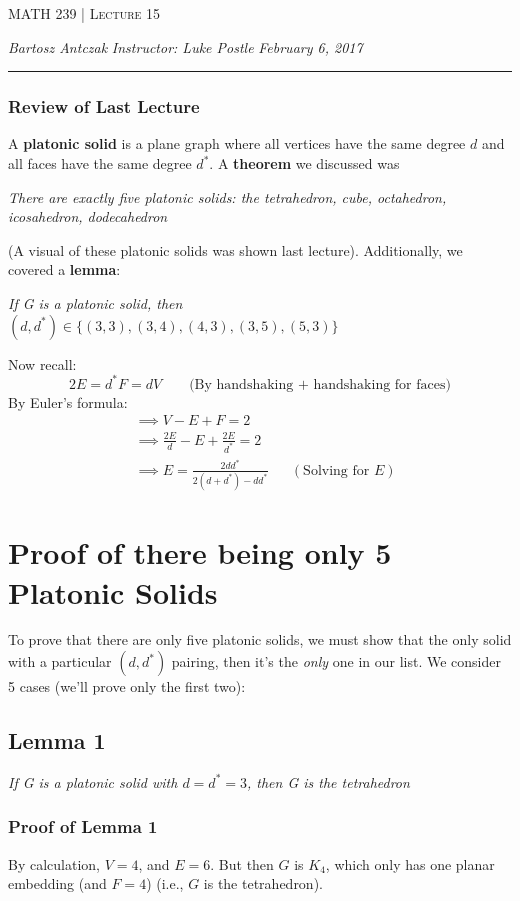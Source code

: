 \documentclass{report}
\newcommand{\lectureNum}{15}
\newcommand{\curDate}{February 6, 2017}
\newcommand{\course}{MATH 239}
\newcommand{\instructor}{Luke Postle}
\begin{document}
\begin{center}
\begin{Large}
\textsc{\course{} | Lecture \lectureNum{}}
\end{Large}
\end{center} 
\noindent \textit{Bartosz Antczak} \hfill
\textit{Instructor: \instructor{}} \hfill
\textit{\curDate{}}
\rule{\textwidth}{0.4pt}

\subsubsection{Review of Last Lecture}
A \textbf{platonic solid} is a plane graph where all vertices have the same degree $d$ and all faces have the same degree $d^*$. A \textbf{theorem} we discussed was
\begin{center}
\textit{There are exactly five platonic solids: the tetrahedron, cube, octahedron, icosahedron, dodecahedron}
\end{center}
(A visual of these platonic solids was shown last lecture). Additionally, we covered a \textbf{lemma}:
\begin{center}
\textit{If G is a platonic solid, then $(d, d^*) \in \{(3,3),(3,4),(4,3),(3,5),(5,3)\}$}
\end{center}
Now recall: $$2E = d^*F = dV \qquad \text{(By handshaking + handshaking for faces)}$$
By Euler's formula:
\begin{align*}
&\implies V - E + F = 2 \\
&\implies \frac{2E}{d} - E + \frac{2E}{d^*} = 2 \\
&\implies E = \frac{2dd^*}{2(d+d^*)-dd^*} && (\text{Solving for }E)
\end{align*}
\section{Proof of there being only 5 Platonic Solids}
To prove that there are only five platonic solids, we must show that the only solid with a particular $(d, d^*)$ pairing, then it's the \textit{only} one in our list. We consider 5 cases (we'll prove only the first two):
\subsection{Lemma 1}
\begin{center}
\textit{If G is a platonic solid with $d = d^* = 3$, then G is the tetrahedron}
\end{center}
\subsubsection{Proof of Lemma 1}
By calculation, $V = 4$, and $E=6$. But then $G$ is $K_4$, which only has one planar embedding (and $F=4$) (i.e., $G$ is the tetrahedron).
\end{document}
